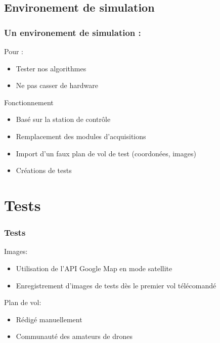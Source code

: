 \documentclass[transparent]{beamer}
\begin{document}
\subsection{Environement de simulation}

\begin{frame}
	\frametitle{Un environement de simulation :}
	\begin{block}{Pour :}
			\begin{itemize}
				\item Tester nos algorithmes
				\item Ne pas casser de hardware
			\end{itemize}
	\end{block}
	\begin{block}{Fonctionnement}
			\begin{itemize}
				\item Basé sur la station de contrôle
				\item Remplacement des modules d'acquisitions
				\item Import d'un faux plan de vol de test (coordonées, images)
				\item Créations de tests
			\end{itemize}
	\end{block}
\end{frame}


\section{Tests}

\begin{frame}
\frametitle{Tests}
	\begin{block}{Images:}
			\begin{itemize}
				\item Utilisation de l'API Google Map en mode satellite
				\item Enregistrement d'images de tests dès le premier vol télécomandé
			\end{itemize}
	\end{block}
	\begin{block}{Plan de vol:}
			\begin{itemize}
				\item Rédigé manuellement
				\item Communauté des amateurs de drones
			\end{itemize}
	\end{block}

\end{frame}
\end{document}

